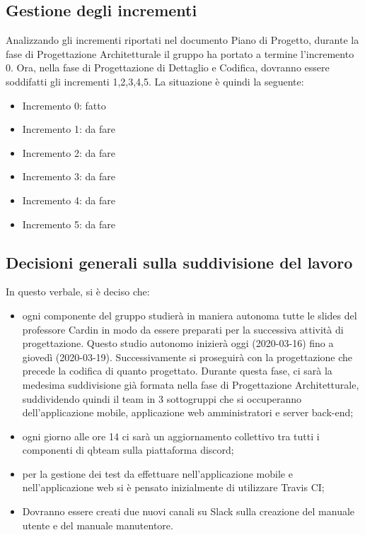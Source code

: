 \subsection{Gestione degli incrementi}
Analizzando gli incrementi riportati nel documento Piano di Progetto, durante la fase di Progettazione Architetturale il gruppo ha portato a termine l'incremento 0.
Ora, nella fase di Progettazione di Dettaglio e Codifica, dovranno essere soddifatti gli incrementi 1,2,3,4,5.
La situazione è quindi la seguente:
\begin{itemize}
	\item Incremento 0: fatto
	\item Incremento 1: da fare
	\item Incremento 2: da fare
	\item Incremento 3: da fare
	\item Incremento 4: da fare
	\item Incremento 5: da fare
\end{itemize}


\subsection{Decisioni generali sulla suddivisione del lavoro}
In questo verbale, si è deciso che:
\begin{itemize}
	\item ogni componente del gruppo studierà in maniera autonoma tutte le slides del professore Cardin in modo da essere preparati per la successiva attività di progettazione.
	Questo studio autonomo inizierà oggi (2020-03-16) fino a giovedì (2020-03-19).
	Successivamente si proseguirà con la progettazione che precede la codifica di quanto progettato.
	Durante questa fase, ci sarà la medesima suddivisione già formata nella fase di Progettazione Architetturale, suddividendo quindi il team in 3 sottogruppi che si occuperanno dell'applicazione mobile, applicazione web amministratori e server back-end;
	\item ogni giorno alle ore 14 ci sarà un aggiornamento collettivo tra tutti i componenti di qbteam sulla piattaforma discord;
	\item per la gestione dei test da effettuare nell'applicazione mobile e nell'applicazione web si è pensato inizialmente di utilizzare Travis CI;
	\item Dovranno essere creati due nuovi canali su Slack sulla creazione del manuale utente e del manuale manutentore.
\end{itemize} 

